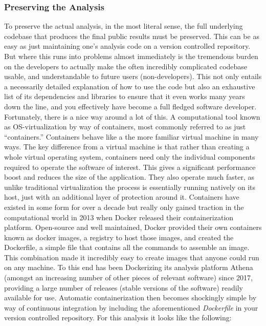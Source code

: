 \subsubsection{Preserving the Analysis}
To preserve the actual analysis, in the most literal sense, the full underlying codebase that produces the final public results must be preserved.
This can be as easy as just maintaining one's analysis code on a version controlled repository.
But where this runs into problems almost immediately is the tremendous burden on the developers to actually make the often incredibly complicated codebase usable, and understandable to future users (non-developers). 
This not only entails a necessarily detailed explanation of how to use the code but also an exhaustive list of its dependencies and libraries to ensure that it even works many years down the line, and you effectively have become a full fledged software developer. 
Fortunately, there is a nice way around a lot of this.
A computational tool known as OS-virtualization by way of containers, most commonly referred to as just ``containers.''
Containers behave like a the more familiar virtual machine in many ways. 
The key difference from a virtual machine is that rather than creating a whole virtual operating system, containers need only the individual components required to operate the software of interest.
This gives a significant performance boost and reduces the size of the application.
They also operate much faster, as unlike traditional virtualization the process is essentially running natively on its host, just with an additional layer of protection around it.
Containers have existed in some form for over a decade but really only gained traction in the computational world in 2013 when Docker released their containerization platform.
Open-source and well maintained, Docker provided their own containers known as docker images, a registry to host those images, and created the Dockerfile, a simple file that contains all the commands to assemble an image. 
This combination made it incredibly easy to create images that anyone could run on any machine.
To this end \ATLAS has been Dockerizing its analysis platform Athena \cite{Athena:2021} (amongst an increasing number of other pieces of relevant software) since 2017, providing a large number of releases (stable versions of the software) readily available for use.
Automatic containerization then becomes shockingly simple by way of continuous integration by including the aforementioned \emph{Dockerfile} in your version controlled repository.
For this analysis it looks like the following:
